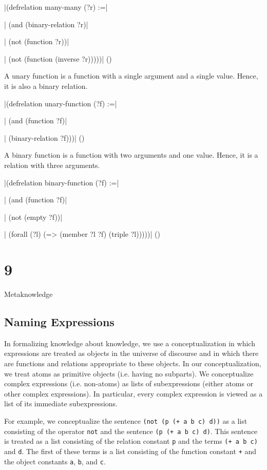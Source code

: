 \medskip
\verbatim|(defrelation many-many (?r) :=|\par
\verbatim|  (and (binary-relation ?r)|\par
\verbatim|       (not (function ?r))|\par
\verbatim|       (not (function (inverse ?r)))))|
\hfill(\equation)\par
\medskip

A unary function is a function with a single argument and a single value. 
Hence, it is also a binary relation. 

\medskip
\verbatim|(defrelation unary-function (?f) :=|\par
\verbatim|  (and (function ?f)|\par
\verbatim|       (binary-relation ?f)))|
\hfill(\equation)\par
\medskip

A binary function is a function with two arguments and one value.  Hence, it
is a relation with three arguments. 

\medskip
\verbatim|(defrelation binary-function (?f) :=|\par
\verbatim|  (and (function ?f)|\par
\verbatim|       (not (empty ?f))|\par
\verbatim|       (forall (?l) (=> (member ?l ?f) (triple ?l)))))|
\hfill(\equation)\par 
\medskip

\vfill\eject

\chapter{9}{Metaknowledge}

\section{Naming Expressions}

In formalizing knowledge about knowledge, we use a conceptualization in which
expressions are treated as objects in the universe of discourse and in which
there are functions and relations appropriate to these objects.  In our
conceptualization, we treat atoms as primitive objects (i.e. having no
subparts).  We conceptualize complex expressions (i.e. non-atoms) as lists of
subexpressions (either atoms or other complex expressions).  In particular, every
complex expression is viewed as a list of its immediate subexpressions.

For example, we conceptualize the sentence {\tt (not (p (+ a b c) d))} as a
list consisting of the operator {\tt not} and the sentence {\tt (p (+ a b c)
d)}.  This sentence is treated as a list consisting of the relation constant
{\tt p} and the terms {\tt (+ a b c)} and {\tt d}.  The first of these terms
is a list consisting of the function constant {\tt +} and the object constants
{\tt a}, {\tt b}, and {\tt c}.

